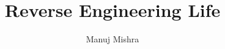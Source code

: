 \documentclass[a4paper, twoside]{report}
\title{Reverse Engineering Life}
\author{Manuj Mishra}
\begin{document}
\renewcommand{\listtheoremname}{List of Definitions}
\renewcommand{\vec}[1]{\underline{\mathbf{#1}}}
\newcommand{\round}[1]{\ensuremath{\lfloor#1\rceil}}



\begin{abstract}

\end{abstract}

\renewcommand{\abstractname}{Acknowledgements}

\begin{abstract}

\end{abstract}

\tableofcontents
\listoffigures
\listoftheorems[ignoreall, show={definition}]
\begingroup
\let\clearpage\relax
\listofalgorithms
\endgroup











\end{document}
